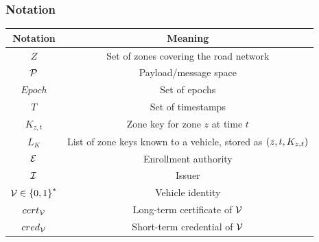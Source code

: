 \documentclass{beamer}
\begin{document}
    \begin{frame}
        \frametitle{Notation}
        \begin{table}[!ht]
            \centering
            \begin{tabular}{|c|c|}
                \hline
                \textbf{Notation} & \textbf{Meaning} \\
                \hline
                \(Z\) & Set of zones covering the road network \\
                \hline
                \(\mathcal P\) & Payload/message space \\
                \hline
                \(Epoch\) & Set of epochs \\
                \hline
                \(T\) & Set of timestamps \\
                \hline
                \(K_{z,t}\) & Zone key for zone \(z\) at time \(t\) \\
                \hline
                \(L_K\) & List of zone keys known to a vehicle, stored as
                \(\left(z,t,K_{z,t}\right)\) \\
                \hline
                \(\mathcal E\) & Enrollment authority \\
                \hline
                \(\mathcal I\) & Issuer \\
                \hline
                \(\mathcal V \in \left\{0,1\right\}^*\) & Vehicle identity \\
                \hline
                \(cert_{\mathcal V}\) & Long-term certificate of \(\mathcal V\) \\
                \hline
                \(cred_{\mathcal V}\) & Short-term credential of \(\mathcal V\) \\
                \hline
            \end{tabular}
        \end{table}
    \end{frame}
\end{document}
